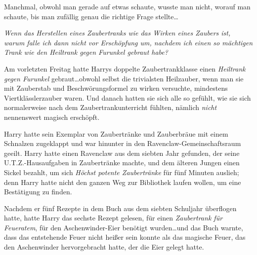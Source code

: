 Manchmal, obwohl man gerade auf etwas schaute, wusste man nicht, worauf man schaute, bis man zufällig genau die richtige Frage stellte…

\emph{Wenn das Herstellen eines Zaubertranks wie das Wirken eines Zaubers ist, warum falle ich dann nicht vor Erschöpfung um, nachdem ich einen so mächtigen Trank wie den Heiltrank gegen Furunkel gebraut habe?}

Am vorletzten Freitag hatte Harrys doppelte Zaubertrankklasse einen \emph{Heiltrank gegen Furunkel} gebraut…obwohl selbst die trivialsten Heilzauber, wenn man sie mit Zauberstab und Beschwörungsformel zu wirken versuchte, mindestens Viertklässlerzauber waren. Und danach hatten sie sich alle so gefühlt, wie sie sich normalerweise nach dem Zaubertrankunterricht fühlten, nämlich \emph{nicht} nennenswert magisch erschöpft.

Harry hatte sein Exemplar von Zaubertränke und Zauberbräue mit einem Schnalzen zugeklappt und war hinunter in den Ravenclaw-Gemeinschaftsraum geeilt. Harry hatte einen Ravenclaw aus dem siebten Jahr gefunden, der seine U.T.Z.-Hausaufgaben in Zaubertränke machte, und dem älteren Jungen einen Sickel bezahlt, um sich \emph{Höchst potente Zaubertränke} für fünf Minuten auslieh; denn Harry hatte nicht den ganzen Weg zur Bibliothek laufen wollen, um eine Bestätigung zu finden.

Nachdem er fünf Rezepte in dem Buch aus dem siebten Schuljahr überflogen hatte, hatte Harry das sechste Rezept gelesen, für einen \emph{Zaubertrank für Feueratem}, für den Aschenwinder-Eier benötigt wurden…und das Buch warnte, dass das entstehende Feuer nicht heißer sein konnte als das magische Feuer, das den Aschenwinder hervorgebracht hatte, der die Eier gelegt hatte.

